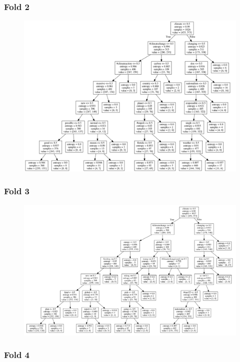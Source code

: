 \documentclass[11pt]{article}
\makeatletter
\def\maxwidth{\ifdim\Gin@nat@width>\linewidth\linewidth
    \else\Gin@nat@width\fi}
\let\Oldincludegraphics\includegraphics
\renewcommand{\includegraphics}[1]{\Oldincludegraphics[width=.8\maxwidth]{#1}}
\makeatother
\begin{document}
\subsubsection*{Fold 2}\label{fold-2}

\begin{figure}[H]
\centering
\includegraphics{2.png}
\caption{}
\end{figure}

\subsubsection*{Fold 3}\label{fold-3}

\begin{figure}[H]
\centering
\includegraphics{3.png}
\caption{}
\end{figure}

\subsubsection*{Fold 4}\label{fold-4}
\end{document}
